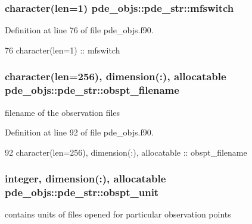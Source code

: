 \subsubsection[{mfswitch}]{\setlength{\rightskip}{0pt plus 5cm}character(len=1) pde\+\_\+objs\+::pde\+\_\+str\+::mfswitch}\label{structpde__objs_1_1pde__str_a55e55e59710a86926c888b3307a275e3}


Definition at line 76 of file pde\+\_\+objs.\+f90.


\begin{DoxyCode}
76     \textcolor{keywordtype}{character(len=1)}                                 :: mfswitch          
\end{DoxyCode}
\subsubsection[{obspt\+\_\+filename}]{\setlength{\rightskip}{0pt plus 5cm}character(len=256), dimension(\+:), allocatable pde\+\_\+objs\+::pde\+\_\+str\+::obspt\+\_\+filename}\label{structpde__objs_1_1pde__str_a9a794a94a7b8625b1dd53bc0057bd7f9}


filename of the observation files 



Definition at line 92 of file pde\+\_\+objs.\+f90.


\begin{DoxyCode}
92     \textcolor{keywordtype}{character(len=256)}, \textcolor{keywordtype}{dimension(:)}, \textcolor{keywordtype}{allocatable}    :: obspt\_filename
\end{DoxyCode}
\subsubsection[{obspt\+\_\+unit}]{\setlength{\rightskip}{0pt plus 5cm}integer, dimension(\+:), allocatable pde\+\_\+objs\+::pde\+\_\+str\+::obspt\+\_\+unit}\label{structpde__objs_1_1pde__str_af50119d68032cbe96973d8742d7c5aa1}


contains units of files opened for particular observation points 



